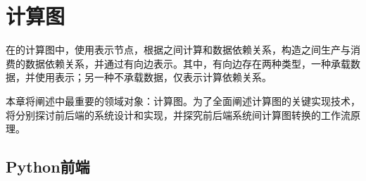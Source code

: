 \begin{savequote}[45mm]
\end{savequote}

\chapter{计算图} 
\label{ch:computation-graph}

\begin{content}

在\tf{}的计算图中，使用表示节点，根据之间计算和数据依赖关系，构造之间生产与消费的数据依赖关系，并通过有向边表示。其中，有向边存在两种类型，一种承载数据，并使用表示；另一种不承载数据，仅表示计算依赖关系。

本章将阐述\tf{}中最重要的领域对象：计算图。为了全面阐述计算图的关键实现技术，将分别探讨前后端的系统设计和实现，并探究前后端系统间计算图转换的工作流原理。

\end{content}

\section{Python前端}

